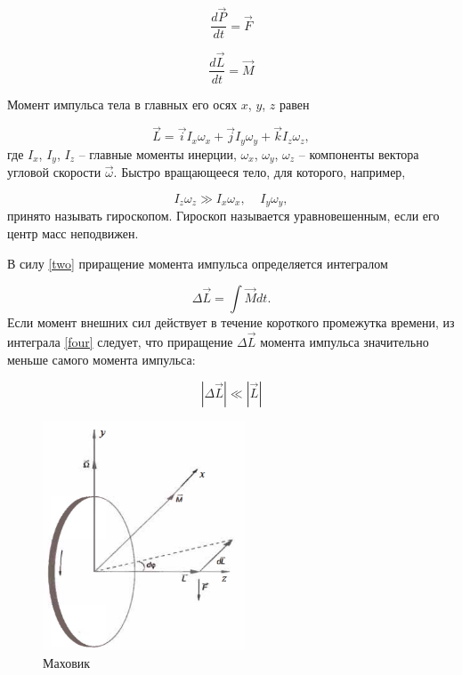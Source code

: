 \documentclass[a4paper,12pt]{article} %
\begin{document}
\begin{equation}
\frac{d\vec{P}}{dt}=\vec{F}
\label{one}
\end{equation}

\begin{equation}
\frac{d\vec{L}}{dt}=\vec{M}
\label{two}
\end{equation}

Момент импульса тела в главных его осях $x$, $y$, $z$ равен

\begin{equation}
\vec{L} = \vec{i}I_x\omega_x+\vec{j}I_y\omega_y+\vec{k}I_z\omega_z,
\label{three}
\end{equation}
где $ I_x $, $ I_y $, $ I_z $ -- главные моменты инерции, $ \omega_x $, $ \omega_y $, $ \omega_z $ -- компоненты вектора угловой скорости $ \vec{\omega} $. Быстро вращающееся тело, для которого, например,

\begin{equation}
I_z\omega_z \gg I_x\omega_x,\;\;\;\;I_y\omega_y,
\end{equation} 
принято называть гироскопом. Гироскоп называется уравновешенным, если его центр масс неподвижен.

В силу \eqref{two} приращение момента импульса определяется интегралом

\begin{equation}
\Delta\vec{L} = \int\vec{M} dt.
\label{four}
\end{equation}
Если момент внешних сил действует в течение короткого промежутка времени, из интеграла \eqref{four} следует, что приращение $ \Delta \vec{L} $ момента импульса значительно меньше самого момента импульса:

\begin{equation}
\left|\Delta \vec{L}\right| \ll \left|\vec{L}\right| 
\end{equation}

\begin{figure}
	\includegraphics[width=6cm]{mahovik.png}
	\caption{Маховик}
	\label{mahovik}
\end{figure}
\end{document}
